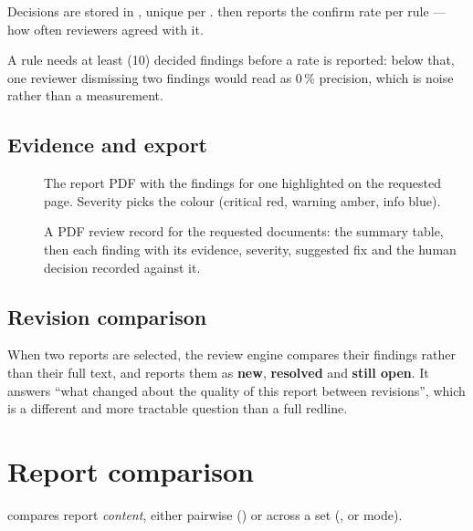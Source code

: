 Decisions are stored in , unique per
. 
then reports the confirm rate per rule --- how often reviewers agreed with it.

A rule needs at least  (10) decided findings
before a rate is reported: below that, one reviewer dismissing two findings
would read as 0\,\% precision, which is noise rather than a measurement.

\subsection{Evidence and export}

\begin{description}
\item[] The report PDF with the
findings for one  highlighted on the requested page. Severity
picks the colour (critical red, warning amber, info blue).

\item[] A PDF review record for the requested
documents: the summary table, then each finding with its evidence, severity,
suggested fix and the human decision recorded against it.
\end{description}

\subsection{Revision comparison}

When two reports are selected, the review engine compares their findings rather
than their full text, and reports them as \textbf{new}, \textbf{resolved} and
\textbf{still open}. It answers ``what changed about the quality of this report
between revisions'', which is a different and more tractable question than a
full redline.

\section{Report comparison}

 compares report \emph{content}, either pairwise
() or across a set
(,  or 
mode).

